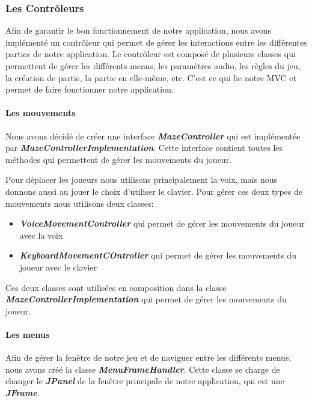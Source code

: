 \subsubsection{Les Contrôleurs}
\label{subsubsec:controleur}

Afin de garantir le bon fonctionnement de notre application, nous avons implémenté un contrôleur qui permet de gérer les interactions entre les différentes parties de notre application. Le contrôleur est composé de plusieurs classes qui permettent de gérer les différents menus, les paramètres audio, les règles du jeu, la création de partie, la partie en elle-même, etc. C'est ce qui lie notre MVC et permet de faire fonctionner notre application.

\paragraph{Les mouvements}

Nous avons décidé de créer une interface \textbf{\textit{MazeController}} qui est implémentée par \textbf{\textit{MazeControllerImplementation}}. Cette interface
contient toutes les méthodes qui permettent de gérer les mouvements du joueur.


Pour déplacer les joueurs nous utilisons principalement la voix, mais nous donnons aussi au jouer le choix d'utiliser le clavier. Pour gérer ces deux types de mouvements
nous utilisons deux classes:
\begin{itemize}
    \item \textbf{\textit{VoiceMovementController}} qui permet de gérer les mouvements du joueur avec la voix
    \item \textbf{\textit{KeyboardMovementCOntroller}} qui permet de gérer les mouvements du joueur avec le clavier
\end{itemize}
Ces deux classes sont utilisées en composition dans la classe \textbf{\textit{MazeControllerImplementation}} qui permet de gérer les mouvements du joueur.


\paragraph{Les menus}

Afin de gérer la fenêtre de notre jeu et de naviguer entre les différents menus, nous avons créé la classe \textbf{\textit{MenuFrameHandler}}. Cette classe se charge de changer le \textbf{\textit{JPanel}} de la fenêtre principale de notre application, qui est une \textbf{\textit{JFrame}}.


